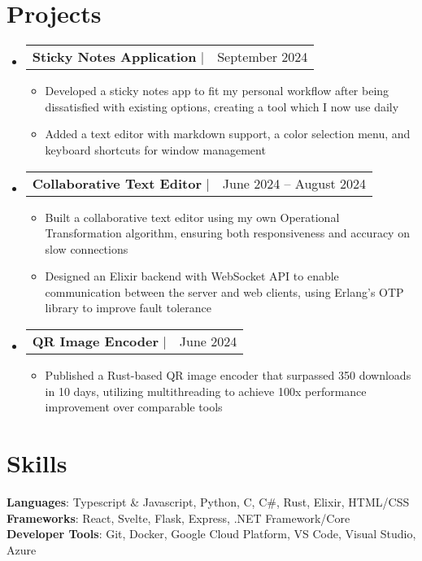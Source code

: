 \documentclass[letterpaper,11pt]{article}
\makeatletter
\newcommand{\resumeItem}[1]{
  \item\small{
    {#1 \vspace{-2pt}}
  }
}
\newcommand{\resumeProjectHeading}[2]{
    \item
    \begin{tabular*}{0.97\textwidth}{l@{\extracolsep{\fill}}r}
      \small#1 & #2 \\
    \end{tabular*}\vspace{-7pt}
}
\newcommand{\resumeSubHeadingListStart}{\begin{itemize}[leftmargin=0.15in, label={}]}
\newcommand{\resumeSubHeadingListEnd}{\end{itemize}}
\newcommand{\resumeItemListStart}{\begin{itemize}}
\newcommand{\resumeItemListEnd}{\end{itemize}\vspace{-5pt}}
\makeatother
\begin{document}
\section{Projects}
    \resumeSubHeadingListStart
      \resumeProjectHeading{\textbf{Sticky Notes Application} $|$ \href{https://github.com/andrewyur/md-sticky}{\underline{\smash{https://github.com/andrewyur/md-sticky}}}}{September 2024}
      \resumeItemListStart
        \resumeItem{Developed a sticky notes app to fit my personal workflow after being dissatisfied with existing options, creating a tool which I now use daily}
        \resumeItem{Added a text editor with markdown support, a color selection menu, and keyboard shortcuts for window management}
      \resumeItemListEnd
      \resumeProjectHeading{\textbf{Collaborative Text Editor} $|$ \href{https://collab-notepad.super-youtube.com}{\underline{\smash{https://collab-notepad.super-youtube.com}}}}{
        June 2024 -- August 2024}
      \resumeItemListStart
        \resumeItem{Built a collaborative text editor using my own Operational Transformation algorithm, ensuring both responsiveness and accuracy on slow connections}
        \resumeItem{Designed an Elixir backend with WebSocket API to enable communication between the server and web clients, using Erlang’s OTP library to improve fault tolerance}
      \resumeItemListEnd
      \resumeProjectHeading{\textbf{QR Image Encoder} $|$ \href{https://crates.io/crates/qart
      }{\underline{\smash{https://crates.io/crates/qart}
      }}}{June 2024}
      \resumeItemListStart
        \resumeItem{Published a Rust-based QR image encoder that surpassed 350 downloads in 10 days, utilizing multithreading to achieve 100x performance improvement over comparable tools}
      \resumeItemListEnd
    \resumeSubHeadingListEnd



%
\section{Skills}
 \begin{itemize}[leftmargin=0.15in, label={}]
    \small{\item{
     \textbf{Languages}{: Typescript \& Javascript, Python, C, C\#, Rust, Elixir, HTML/CSS} \\
     \textbf{Frameworks}{: React, Svelte, Flask, Express, .NET Framework/Core} \\
     \textbf{Developer Tools}{: Git, Docker, Google Cloud Platform, VS Code, Visual Studio, Azure}
    }}
 \end{itemize}


\end{document}
